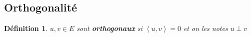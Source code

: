 \documentclass[a4paper]{article}
\newcommand{\scalair}[1]{\left\langle #1 \right\rangle}
\newtheorem{definition}{Définition}[section]
\begin{document}
\subsection{Orthogonalité}
\begin{definition}
    $u, v \in E$ sont \textbf{orthogonaux} si $\scalair{u, v} = 0$ et on les notes  $u \perp v$
\end{definition}
\end{document}
